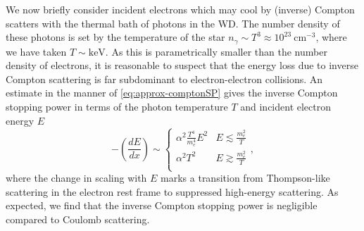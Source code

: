 \documentclass[twocolumn,showpacs,preprintnumbers,amsmath,amssymb,prd]{revtex4}
\newcommand{\cm}{\text{cm}}
\def\r{\right)}
\def\l{\left(}
\begin{document}
\begin{appendices}
We now briefly consider incident electrons which may cool by (inverse) Compton scatters with the thermal bath of photons in the WD.  
The number density of these photons is set by the temperature of the star $n_\gamma \sim T^3 \approx 10^{23} ~\cm^{-3}$, where we have taken $T \sim \text{keV}$. 
As this is parametrically smaller than the number density of electrons, it is reasonable to suspect that the energy loss due to inverse Compton scattering is far subdominant to electron-electron collisions.
An estimate in the manner of \eqref{eq:approx-comptonSP} gives the inverse Compton stopping power in terms of the photon temperature $T$ and incident electron energy $E$ 
\begin{equation}
\label{eq:invcomptonSP}
  -\l \frac{dE}{dx}\r \sim 
  \begin{cases}
    \alpha^2 \frac{T^4}{m_e^4} E^2 & E \lesssim \frac{m_e^2}{T} \\
    \alpha^2 T^2 & E \gtrsim \frac{m_e^2}{T} \\
  \end{cases},
\end{equation}
where the change in scaling with $E$ marks a transition from Thompson-like scattering in the electron rest frame to suppressed high-energy scattering.
As expected, we find that the inverse Compton stopping power is negligible compared to Coulomb scattering. 


\end{appendices}
\end{document}
